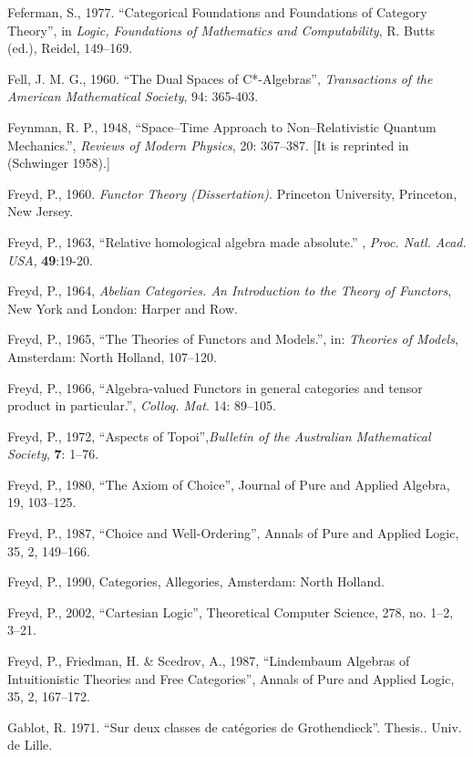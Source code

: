 \documentclass[12pt]{article}
\theoremstyle{plain}
\theoremstyle{definition}
\numberwithin{equation}{section}
\begin{document}
\begin{thebibliography}{99}
Feferman, S., 1977. ``Categorical Foundations and Foundations of Category Theory'', in \emph{Logic, Foundations of Mathematics and Computability}, R. Butts (ed.), Reidel, 149--169.

Fell, J. M. G., 1960. ``The Dual Spaces of  C*-Algebras'', 
\emph{Transactions of the American Mathematical Society}, 94: 365-403. 

Feynman, R. P., 1948, ``Space--Time Approach to Non--Relativistic Quantum 
Mechanics.'', \emph{Reviews of Modern Physics}, 20: 367--387. [It is reprinted in (Schwinger 1958).] 

Freyd, P., 1960. {\em Functor Theory (Dissertation)}. Princeton University, Princeton, New Jersey.
 
Freyd, P., 1963, ``Relative homological algebra made absolute.'' , {\em Proc. Natl. Acad. USA}, \textbf{49}:19-20.
  
Freyd, P., 1964, {\em Abelian Categories. An Introduction to the Theory of Functors}, New York and London: Harper and Row.  

Freyd, P., 1965, ``The Theories of Functors and Models.'', in: {\em Theories of Models}, Amsterdam: North Holland, 107--120. 

Freyd, P., 1966, ``Algebra-valued Functors in general categories and tensor product in particular.'', {\em Colloq. Mat}. 
{14}: 89--105.

Freyd, P., 1972, ``Aspects of Topoi'',{\em Bulletin of the Australian Mathematical Society}, \textbf{7}: 1--76.  

Freyd, P., 1980, ``The Axiom of Choice'', Journal of Pure and Applied Algebra, 19, 103--125. 

Freyd, P., 1987, ``Choice and Well-Ordering'', Annals of Pure and Applied Logic, 35, 2, 149--166.  

Freyd, P., 1990, Categories, Allegories, Amsterdam: North Holland. 

Freyd, P., 2002, ``Cartesian Logic'', Theoretical Computer Science, 278, no. 1--2, 3--21.  

Freyd, P., Friedman, H. \& Scedrov, A., 1987, ``Lindembaum Algebras of Intuitionistic Theories and Free Categories'', Annals of Pure and Applied Logic, 35, 2, 167--172.

Gablot, R. 1971. ``Sur deux classes de cat\'{e}gories de Grothendieck''. Thesis..  Univ. de Lille.


\end{thebibliography}
\end{document}
